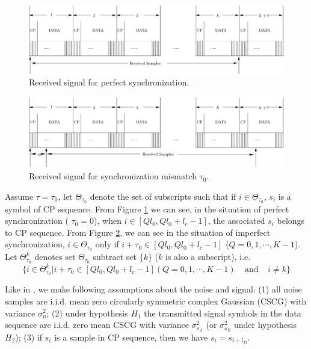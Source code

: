\begin{figure}[!t]
  \centering 
  \includegraphics[width=\textwidth]{4/fig2.eps}
  \caption{Received signal for perfect synchronization.}
  \label{pic:1222ext0}
\end{figure}

\begin{figure}[!t]
  \centering 
  \includegraphics[width=\textwidth]{4/fig3.eps}
  \caption{Received signal for synchronization mismatch $\tau_0$.}
  \label{pic:1222a2}
\end{figure}
Assume $\tau = \tau_0$, let $\Theta_{\tau_0}$ denote the set of subscripts such that if $i \in \Theta_{\tau_0}$,  $s_i$ is a symbol of CP sequence. From Figure \ref{pic:1222ext0} we can see, in the situation of perfect synchronization ( $\tau_0 =0$), when $i \in [Ql_0, Ql_0+l_c-1]$, the associated $s_i$ belongs to CP sequence. 
From Figure \ref{pic:1222a2}, we can see in the situation of imperfect synchronization, $i \in \Theta_{\tau_0}$ only if $i + \tau_0 \in [Ql_0, Ql_0+l_c -1]$ ($Q = 0, 1, \cdots, K-1$). 
Let $\Theta_{\tau_0}^k$ denotes set $\Theta_{\tau_0}$ subtract set $\{k\}$ ($k$ is also a subscript), i.e.
\begin{equation}
  \{i\in \Theta_{\tau_0}^k| i + \tau_0 \in [Ql_0, Ql_0+l_c -1] (Q = 0, 1, \cdots, K-1)\;\;\;\; \text{and}\;\;\;\; i\neq k\}
  \label{definitionof}
\end{equation}

Like in  \cite{axell2011optimal}, we make following assumptions about the noise and signal: (1) all noise samples are i.i.d. mean zero circularly symmetric complex Gaussian (CSCG) with variance $\sigma_n^2$; (2) under hypothesis $H_1$ the transmitted signal symbols in the data sequence are i.i.d. zero mean CSCG with variance $\sigma_{s_A}^2$ (or $\sigma_{s_B}^2$ under hypothesis $H_2$); (3) if $s_i$ is a sample in CP sequence, then we have $s_i = s_{i+l_D}$. 

